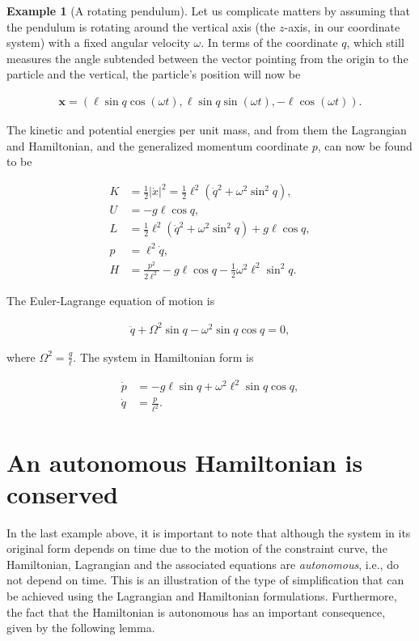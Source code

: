 \documentclass[11pt]{report}
\theoremstyle{plain}
\theoremstyle{definition}
\newtheorem{example}[thm]{Example}
\begin{document}
\begin{example}[A rotating pendulum]
Let us complicate matters by assuming that the
pendulum is rotating around the vertical axis (the
$z$-axis, in our coordinate system) with a fixed
angular velocity $\omega$. In terms of the coordinate
$q$, which still measures the angle subtended between
the vector pointing from the origin to the particle
and the vertical, the particle's position will now be

\begin{align*}
\mathbf{x} = (\ell \sin q \cos(\omega t), \ell \sin q \sin(\omega t), -\ell\cos(\omega t)).
\end{align*}

The kinetic and potential energies per unit mass, and
from them the Lagrangian and Hamiltonian, and the
generalized momentum coordinate $p$, can now be found
to be

\begin{align*}
K &= \tfrac12|\dot{x}|^2 = \tfrac12 \ell^2(\dot{q}^2 + \omega^2 \sin^2 q), \\
U &= -g\ell \cos q, \\
L &= \tfrac12\ell^2(\dot{q}^2+\omega^2\sin^2 q)+g\ell\cos q, \\
p &= \ell^2 \dot{q}, \\
H &= \frac{p^2}{2\ell^2}-g\ell\cos q-\tfrac12 \omega^2 \ell^2 \sin^2 q.
\end{align*}

The Euler-Lagrange equation of motion is

\begin{align*}
\ddot{q} + \Omega^2 \sin q - \omega^2 \sin q \cos q = 0,
\end{align*}

where $\Omega^2 = \frac{g}{\ell}$. The system in
Hamiltonian form is

\begin{align*}
\dot{p} &= -g\ell \sin q + \omega^2 \ell^2 \sin q \cos q, \\
\dot{q} &= \frac{p}{\ell^2}.
\end{align*}

\end{example}

\section{An autonomous Hamiltonian is conserved}
In the last example above, it is important to note
that although the system in its original form depends
on time due to the motion of the constraint curve, the
Hamiltonian, Lagrangian and the associated equations
are \emph{autonomous}, i.e., do not depend on time. This is
an illustration of the type of simplification that can
be achieved using the Lagrangian and Hamiltonian
formulations. Furthermore, the fact that the
Hamiltonian is autonomous has an important
consequence, given by the following lemma.
\end{document}
